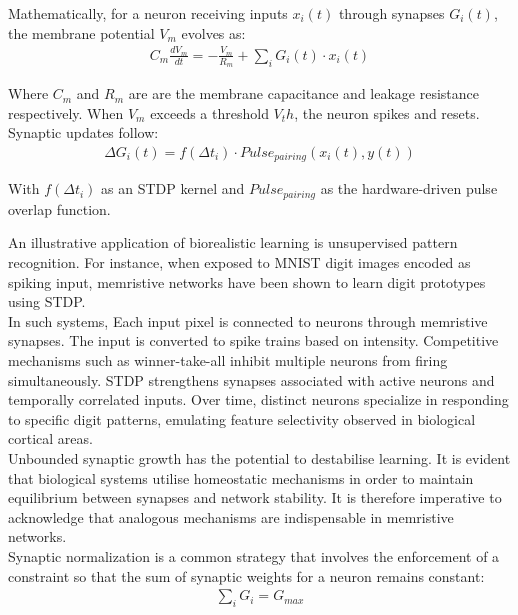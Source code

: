 \noindent Mathematically, for a neuron receiving inputs $x_i(t)$ through synapses $G_i(t)$, the membrane potential $V_m$ evolves as:
\begin{align}
    C_m \frac{dV_m}{dt} = -\frac{V_m}{R_m} + \sum_{i} G_i(t) \cdot x_i(t) \label{eq:2.36}
\end{align}

\noindent Where $C_m$ and $R_m$ are are the membrane capacitance and leakage resistance respectively. When $V_m$ exceeds a threshold $V_th$, the neuron spikes and resets. Synaptic updates follow:
\begin{align}
    \Delta G_i(t) = f(\Delta t_i) \cdot Pulse_{pairing}(x_i(t), y(t)) \label{eq:2.37}
\end{align}

\noindent With $f(\Delta t_i)$ as an STDP kernel and $Pulse_{pairing}$ as the hardware-driven pulse overlap function.

\noindent An illustrative application of biorealistic learning is unsupervised pattern recognition. For instance, when exposed to MNIST digit images encoded as spiking input, memristive networks have been shown to learn digit prototypes using STDP.\\

\noindent In such systems, Each input pixel is connected to neurons through memristive synapses. The input is converted to spike trains based on intensity. Competitive mechanisms such as winner-take-all inhibit multiple neurons from firing simultaneously. STDP strengthens synapses associated with active neurons and temporally correlated inputs. Over time, distinct neurons specialize in responding to specific digit patterns, emulating feature selectivity observed in biological cortical areas.\\

\noindent Unbounded synaptic growth has the potential to destabilise learning. It is evident that biological systems utilise homeostatic mechanisms in order to maintain equilibrium between synapses and network stability. It is therefore imperative to acknowledge that analogous mechanisms are indispensable in memristive networks. \\

\noindent Synaptic normalization is a common strategy that involves the enforcement of a constraint so that the sum of synaptic weights for a neuron remains constant:
\begin{align}
    \sum_{i} G_i = G_{max} \label{eq:2.38}
\end{align}

